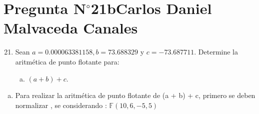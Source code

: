 \section{Pregunta N$^{\circ}$21b\qquad Carlos Daniel Malvaceda Canales}

\begin{frame}
	\begin{enumerate}\setcounter{enumi}{20}
		\item

		      Sean $a=0.000063381158, b=73.688329$ y $c=-73.687711$.
		      Determine la aritmética de punto flotante para:

		      \begin{enumerate}[b)]
			      \item

			            \begin{math}
				            \left(a+b\right)+c
			            \end{math}.
		      \end{enumerate}
	\end{enumerate}

	\begin{solution}
		\begin{enumerate}[b)]
			\item
			      Para realizar la aritmética de punto flotante de (a + b) + c, primero se deben normalizar , se considerando :
			      \begin{math}
				      \mathbb{F}\left(10,6,-5,5\right)
			      \end{math}


\end{enumerate}
\end{solution}
\end{frame}
